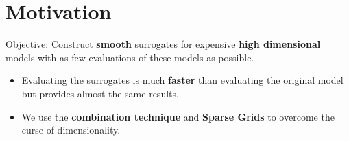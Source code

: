 \documentclass[final,hyperref={pdfpagelabels=false},table]{beamer}
\begin{document}
\begin{frame}
\centering
\begin{columns}[T]
\begin{column}{\colCWidth}


\justifying
\section{Motivation}
Objective: Construct \textbf{smooth} surrogates for expensive \textbf{high dimensional} models with as few evaluations of these models as possible.
\begin{itemize} 
\item Evaluating the surrogates is much \textbf{faster} than evaluating the original model but provides almost the same results.
\item We use the \textbf{combination technique} and \textbf{Sparse Grids} to overcome the curse of dimensionality.
\end{itemize}


\end{column}
\end{columns}
\end{frame}
\end{document}
